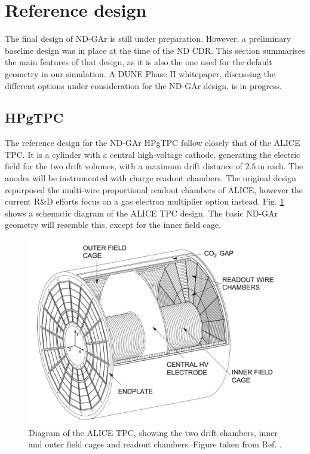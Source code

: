 \section{Reference design}

The final design of ND-GAr is still under preparation. However, a preliminary baseline design was in place at the time of the ND CDR. This section summarises the main features of that design, as it is also the one used for the default geometry in our simulation. A DUNE Phase II whitepaper, discussing the different options under consideration for the ND-GAr design, is in progress. 

\subsection{HPgTPC}

The reference design for the ND-GAr HPgTPC follow closely that of the ALICE TPC. It is a cylinder with a central high-voltage cathode, generating the electric field for the two drift volumes, with a maximum drift distance of $2.5~\mathrm{m}$ each. The anodes will be instrumented with charge readout chambers. The original design repurposed the multi-wire proportional readout chambers of ALICE, however the current R\&D efforts focus on a gas electron multiplier option instead. Fig. \ref{fig:alice_tpc} shows a schematic diagram of the ALICE TPC design. The basic ND-GAr geometry will resemble this, except for the inner field cage.

\begin{figure}[t]
	\centering
	\includegraphics[width=0.7\linewidth]{Images/ND-GAr/alice_tpc}
	\caption[Diagram of the ALICE TPC, showing the two drift chambers, inner and outer field cages and readout chambers.]{Diagram of the ALICE TPC, showing the two drift chambers, inner and outer field cages and readout chambers. Figure taken from Ref. \cite{DUNE2020TDR1}.}
	\label{fig:alice_tpc}
\end{figure}

